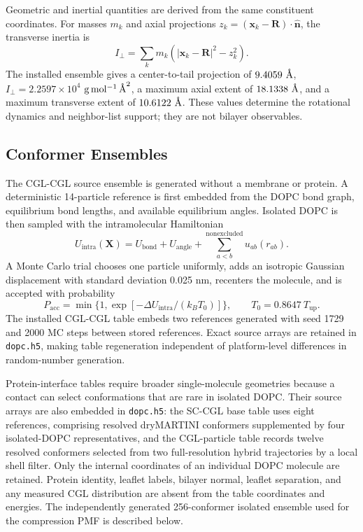 \documentclass{article}
\newcommand{\angstrom}{\text{\normalfont\AA}}
\begin{document}
Geometric and inertial quantities are derived from the same constituent
coordinates.  For masses $m_k$ and axial projections
$z_k=(\mathbf x_k-\mathbf R)\cdot\hat{\mathbf n}$, the transverse inertia is
\begin{equation}
I_{\perp}=\sum_k m_k
\left(|\mathbf x_k-\mathbf R|^2-z_k^2\right).
\label{eq:inertia}
\end{equation}
The installed ensemble gives a center-to-tail projection of
$9.4059~\angstrom$, $I_{\perp}=2.2597\times10^4$
$\mathrm{g\,mol^{-1}\,\angstrom^2}$, a maximum axial extent of
$18.1338~\angstrom$, and a maximum transverse extent of
$10.6122~\angstrom$.  These values determine the rotational dynamics and
neighbor-list support; they are not bilayer observables.

\subsection{Conformer Ensembles}

The CGL-CGL source ensemble is generated without a membrane or protein.  A
deterministic 14-particle reference is first embedded from the DOPC bond graph,
equilibrium bond lengths, and available equilibrium angles.  Isolated DOPC is
then sampled with the intramolecular Hamiltonian
\begin{equation}
U_{\mathrm{intra}}(\mathbf X)=U_{\mathrm{bond}}+U_{\mathrm{angle}}
+\sum_{a<b}^{\mathrm{nonexcluded}}u_{ab}(r_{ab}).
\label{eq:intra}
\end{equation}
A Monte Carlo trial chooses one particle uniformly, adds an isotropic Gaussian
displacement with standard deviation 0.025 nm, recenters the molecule, and is
accepted with probability
\begin{equation}
P_{\mathrm{acc}}=\min\{1,\exp[-\Delta U_{\mathrm{intra}}/(k_BT_0)]\},
\qquad T_0=0.8647~T_{\mathrm{up}}.
\label{eq:mc}
\end{equation}
The installed CGL-CGL table embeds two references generated with seed 1729
and 2000 MC steps between stored references.  Exact source arrays are retained
in \texttt{dopc.h5}, making table regeneration independent of platform-level
differences in random-number generation.

Protein-interface tables require broader single-molecule geometries because a
contact can select conformations that are rare in isolated DOPC.  Their source
arrays are also embedded in \texttt{dopc.h5}: the SC-CGL base table uses eight
references, comprising resolved dryMARTINI conformers supplemented by four
isolated-DOPC representatives, and the CGL-particle table records twelve
resolved conformers selected from two full-resolution hybrid trajectories by
a local shell filter.  Only the internal coordinates of an individual DOPC
molecule are retained.  Protein identity, leaflet labels, bilayer normal,
leaflet separation, and any measured CGL distribution are absent from the
table coordinates and energies.  The independently generated 256-conformer
isolated ensemble used for the compression PMF is described below.
\end{document}
